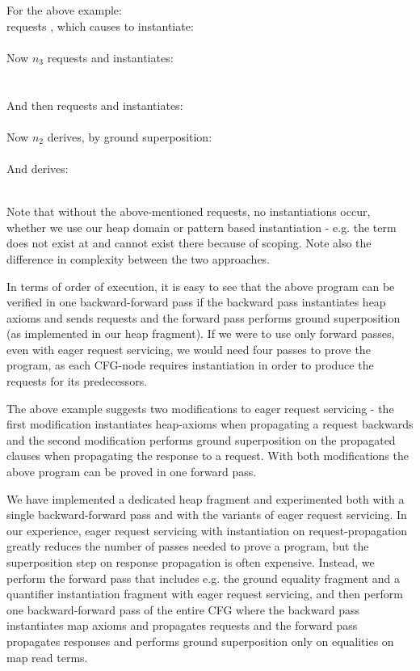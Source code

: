 For the above example:\\
 requests , which causes  to instantiate:\\
\\
Now $n_3$ requests  and  instantiates:\\
\\
\\
And then  requests  and  instantiates:\\
\\
Now $n_2$ derives, by ground superposition:\\
\\
And  derives:\\
\\

Note that without the above-mentioned requests, no instantiations occur, whether we use our heap domain or pattern based instantiation - e.g. the term  does not exist at  and cannot exist there because of scoping.
Note also the difference in complexity between the two approaches.

In terms of order of execution, it is easy to see that the above program can be verified in one backward-forward pass 
if the backward pass instantiates heap axioms and sends requests and the forward pass performs ground superposition (as implemented in our heap fragment). If we were to use only forward passes, even with eager request servicing, we would need four passes to prove the program, 
as each CFG-node requires instantiation in order to produce  the requests for its predecessors.

The above example suggests two modifications to eager request servicing - the first modification instantiates heap-axioms when propagating a request backwards and the second modification performs ground superposition on the propagated clauses when propagating the response to a request. With both modifications the above program can be proved in one forward pass.

We have implemented a dedicated heap fragment and experimented both with a single backward-forward pass and with the variants of eager request servicing.
In our experience, eager request servicing with instantiation on request-propagation greatly reduces the number of passes needed to prove a program, but the superposition step on response propagation is often expensive. Instead, we perform the forward pass that includes e.g. the ground equality fragment and a quantifier instantiation fragment with eager request servicing, and then perform one backward-forward pass of the entire CFG where the backward pass instantiates map axioms and propagates requests and the forward pass propagates responses and performs ground superposition only on equalities on map read terms.




